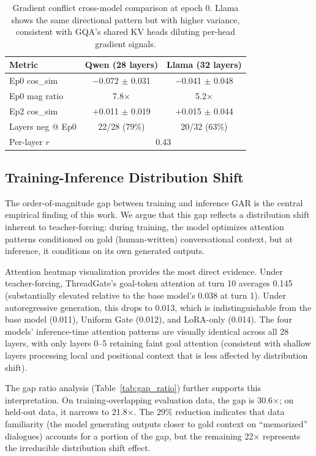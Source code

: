 \documentclass[11pt,a4paper]{article}
\begin{document}
\begin{table}[t]
\centering
\caption{Gradient conflict cross-model comparison at epoch 0. Llama shows the same directional pattern but with higher variance, consistent with GQA's shared KV heads diluting per-head gradient signals.}
\label{tab:gradient_cross}
\small
\begin{tabular}{lcc}
\toprule
\textbf{Metric} & \textbf{Qwen (28 layers)} & \textbf{Llama (32 layers)} \\
\midrule
Ep0 cos\_sim & $-$0.072 $\pm$ 0.031 & $-$0.041 $\pm$ 0.048 \\
Ep0 mag ratio & 7.8$\times$ & 5.2$\times$ \\
Ep2 cos\_sim & $+$0.011 $\pm$ 0.019 & $+$0.015 $\pm$ 0.044 \\
Layers neg @ Ep0 & 22/28 (79\%) & 20/32 (63\%) \\
Per-layer $r$ & \multicolumn{2}{c}{0.43} \\
\bottomrule
\end{tabular}
\end{table}

\subsection{Training-Inference Distribution Shift}

The order-of-magnitude gap between training and inference GAR is the central empirical finding of this work. We argue that this gap reflects a distribution shift inherent to teacher-forcing: during training, the model optimizes attention patterns conditioned on gold (human-written) conversational context, but at inference, it conditions on its own generated outputs.

Attention heatmap visualization provides the most direct evidence. Under teacher-forcing, ThreadGate's goal-token attention at turn 10 averages 0.145 (substantially elevated relative to the base model's 0.038 at turn 1). Under autoregressive generation, this drops to 0.013, which is indistinguishable from the base model (0.011), Uniform Gate (0.012), and LoRA-only (0.014). The four models' inference-time attention patterns are visually identical across all 28 layers, with only layers 0--5 retaining faint goal attention (consistent with shallow layers processing local and positional context that is less affected by distribution shift).

The gap ratio analysis (Table~\ref{tab:gap_ratio}) further supports this interpretation. On training-overlapping evaluation data, the gap is 30.6$\times$; on held-out data, it narrows to 21.8$\times$. The 29\% reduction indicates that data familiarity (the model generating outputs closer to gold context on ``memorized'' dialogues) accounts for a portion of the gap, but the remaining 22$\times$ represents the irreducible distribution shift effect.
\end{document}
